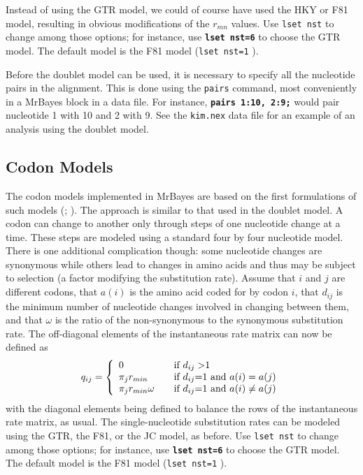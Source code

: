 \documentclass[12pt]{book}
\newcommand{\ttt}[1]{\texttt{#1} }
\newcommand{\tb}[1]{\texttt{\textbf{#1}} }
\begin{document}
Instead of using the GTR model, we could of course have used the HKY or F81 model, resulting in
obvious modifications of the $r_{mn}$ values. Use \ttt{lset nst} to change among those options; for
instance, use \tb{lset nst=6} to choose the GTR model. The default model is the F81 model
(\ttt{lset nst=1}).

Before the doublet model can be used, it is necessary to specify all the nucleotide pairs in the
alignment. This is done using the \ttt{pairs} command, most conveniently in a MrBayes block in a
data file. For instance, \tb{pairs 1:10, 2:9;} would pair nucleotide 1 with 10 and 2 with 9. See
the \ttt{kim.nex} data file for an example of an analysis using the doublet model.

\subsection{Codon Models}
The codon models implemented in MrBayes are based on the first formulations of such models
(\citet{goldman94}; \citet{muse94}). The approach is similar to that used in the doublet model. A
codon can change to another only through steps of one nucleotide change at a time. These steps are
modeled using a standard four by four nucleotide model. There is one additional complication
though: some nucleotide changes are synonymous while others lead to changes in amino acids and thus
may be subject to selection (a factor modifying the substitution rate). Assume that $i$ and $j$ are
different codons, that $a(i)$ is the amino acid coded for by codon $i$, that $d_{ij}$ is the
minimum number of nucleotide changes involved in changing between them, and that $\omega$ is the
ratio of the non-synonymous to the synonymous substitution rate. The off-diagonal elements of the
instantaneous rate matrix can now be defined as
\[
q_{ij} = \left\{ 
\begin{array}{l l}
  0 & \quad \text{if $d_{ij}>$1 } \\
 \pi_j r_{min} & \quad \text{if $d_{ij}$=1 and $a(i)=a(j)$}\\
 \pi_j r_{min} \omega & \quad \text{if $d_{ij}$=1 and $a(i)\neq a(j)$}\\
\end{array} \right.
\]
with the diagonal elements being defined to balance the rows of the instantaneous rate matrix, as
usual. The single-nucleotide substitution rates can be modeled using the GTR, the F81, or the JC
model, as before. Use \ttt{lset nst} to change among those options; for instance, use \tb{lset
nst=6} to choose the GTR model. The default model is the F81 model (\ttt{lset nst=1}).
\end{document}
